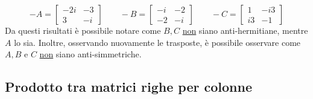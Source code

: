 \documentclass[a4paper]{article}
\begin{document}
	\begin{equation*}
		-A = \begin{bmatrix}
			-2i	& -3	\\
			3	& -i
		\end{bmatrix} \hspace{2em}
		-B = \begin{bmatrix}
			-i 	& -2	\\
			-2	& -i
		\end{bmatrix} \hspace{2em}
		-C = \begin{bmatrix}
			1 	& -i3	\\
			i3	& -1
		\end{bmatrix}
	\end{equation*}
	Da questi risultati è possibile notare come $B,C$ \underline{non} siano anti-hermitiane, mentre $A$ lo sia. Inoltre, osservando nuovamente le trasposte, è possibile osservare come $A, B$ e $C$ \underline{non} siano anti-simmetriche.\newpage
	
	\subsection{Prodotto tra matrici righe per colonne}
	
\end{document}
